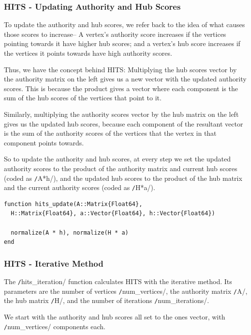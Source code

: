 \documentclass[12pt, titlepage, twoside]{amsart}
\begin{document}
\subsubsection{HITS - Updating Authority and Hub Scores}

To update the authority and hub scores, we refer back to the idea of what causes those scores to increase--
A vertex's authority score increases if the vertices pointing towards it have higher hub scores;
and a vertex's hub score increases if the vertices it points towards have high authority scores.

Thus, we have the concept behind HITS:
Multiplying the hub scores vector by the authority matrix on the left gives us a new vector with the updated authority scores.
This is because the product gives a vector where each component is the sum of the hub scores of the vertices that point to it.

Similarly, multiplying the authority scores vector by the hub matrix on the left gives us the updated hub scores,
because each component of the resultant vector is the sum of the authority scores of the vertices that the vertex in that component points towards.

So to update the authority and hub scores, at every step we set the updated authority scores to the product of the authority matrix and current hub scores (coded as \texttt/A*h/), and the updated hub scores to the product of the hub matrix and the current authority scores (coded as \texttt/H*a/).

\begin{verbatim}
function hits_update(A::Matrix{Float64},
  H::Matrix{Float64}, a::Vector{Float64}, h::Vector{Float64})

  normalize(A * h), normalize(H * a)
end
\end{verbatim}

\subsubsection{HITS - Iterative Method}

The \texttt/hits_iteration/ function calculates HITS with the iterative method.
Its parameters are the number of vertices \texttt/num_vertices/,
the authority matrix \texttt/A/, the hub matrix \texttt/H/,
and the number of iterations \texttt/num_iterations/.

We start with the authority and hub scores all set to the ones vector, with \texttt/num_vertices/ components each.
\end{document}
